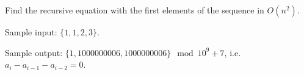 Find the recursive equation with the first elements of the sequence in $O(n^2)$.

Sample input: $\{1, 1, 2, 3\}$.

Sample output: $\{1, 1000000006, 1000000006\}\mod 10^9+7$, i.e. $a_i-a_{i-1}-a_{i-2}=0$.

\inputminted{cpp}{src/mathematics/recurrence-relation/berlekamp-massey-algorithm.cpp.com}
